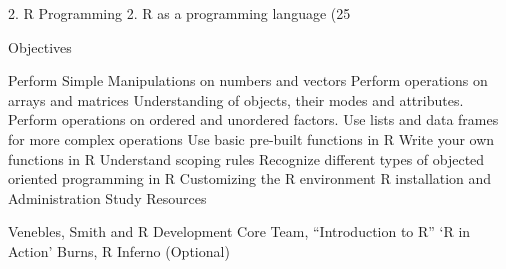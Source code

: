 2. R Programming
2. R as a programming language (25%

Objectives

Perform Simple Manipulations on numbers and vectors
Perform operations on arrays and matrices
Understanding of objects, their modes and attributes.
Perform operations on ordered and unordered factors.
Use lists and data frames for more complex operations
Use basic pre-built functions in R
Write your own functions in R
Understand scoping rules
Recognize different types of objected oriented programming in R
Customizing the R environment
R installation and Administration
Study Resources

Venebles, Smith and R Development Core Team, “Introduction to R”
‘R in Action’
Burns, R Inferno (Optional)
